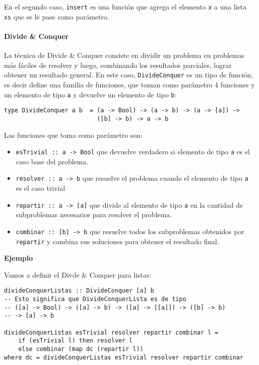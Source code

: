 \documentclass[10pt,a4paper]{article}
\begin{document}
En el segundo caso, \texttt{insert} es una función que agrega el elemento \texttt{x} a una lista \texttt{xs} que se le pase como parámetro.

\paragraph{Divide \& Conquer}
La técnica de Divide \& Conquer consiste en dividir un problema en problemas más fáciles de resolver y luego, combinando los resultados parciales, lograr
obtener un resultado general. En este caso, \texttt{DivideConquer} es un tipo de función, es decir define una familia de funciones, que toman como parámetro 4 funciones y un elemento de tipo \texttt{a} y devuelve un elemento de tipo \texttt{b}:
\begin{centrado}
	\begin{verbatim}
type DivideConquer a b  = (a -> Bool) -> (a -> b) -> (a -> [a]) -> 
                          ([b] -> b) -> a -> b                         
\end{verbatim}
\end{centrado}
Las funciones que toma como parámetro son:
\begin{itemize}
	\item \texttt{esTrivial :: a -> Bool} que devuelve verdadero si elemento de tipo \texttt{a} es el caso base del problema.
	\item \texttt{resolver :: a -> b} que resuelve el problema cuando el elemento de tipo \texttt{a} es el caso trivial
	\item \texttt{repartir :: a -> [a]} que divide al elemento de tipo \texttt{a} en la cantidad de subproblemas necesarios para resolver el problema.
	\item \texttt{combinar :: [b] -> b} que resuelve todos los subproblemas obtenidos por \texttt{repartir} y combina sus soluciones para obtener el resultado final.
\end{itemize}

\textbf{Ejemplo}

Vamos a definir el Divde \& Conquer para listas:
\begin{centrado}
	\begin{verbatim}
divideConquerListas :: DivideConquer [a] b
-- Esto significa que DivideConquerLista es de tipo 
-- ([a] -> Bool) -> ([a] -> b) -> ([a] -> [[a]]) -> ([b] -> b)
-- -> [a] -> b

divideConquerListas esTrivial resolver repartir combinar l =
	if (esTrivial l) then resolver l
	else combinar (map dc (repartir l))
where dc = divideConquerListas esTrivial resolver repartir combinar
                        
	\end{verbatim}
\end{centrado}
\end{document}
